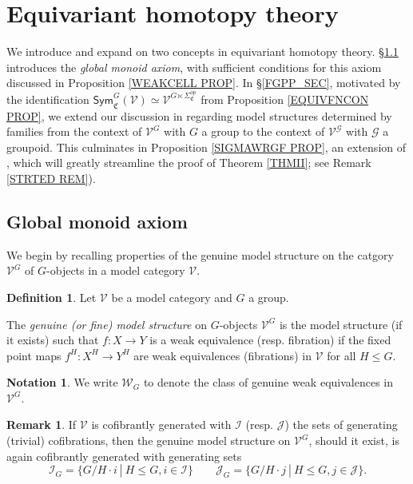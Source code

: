 \documentclass[a4paper,10pt
,draft
]{article}%
\numberwithin{equation}{section}
\numberwithin{figure}{section}
\theoremstyle{definition} %
\newtheorem{definition}[equation]{Definition}%
\newtheorem{remark}[equation]{Remark}%
\newtheorem{notation}[equation]{Notation}%
\newcommand{\V}{\ensuremath{\mathcal V}}
\newcommand{\G}{\ensuremath{\mathcal G}}
\newcommand{\1}{\ensuremath{\mathbbm 1}}%
\begin{document}
\section{Equivariant homotopy theory}
\label{EHT_SEC}


We introduce and expand on two concepts in equivariant homotopy theory.
\S \ref{GMA_SEC} introduces the \emph{global monoid axiom}, 
with sufficient conditions for this axiom discussed in 
Proposition \ref{WEAKCELL PROP}.
In \S \ref{FGPP_SEC},
motivated by the identification
$\mathsf{Sym}^{G}_{\mathfrak{C}}(\V)
\simeq \V^{G \ltimes \Sigma^{op}_{\mathfrak{C}}}$
from Proposition \ref{EQUIVFNCON PROP}, 
we extend our discussion 
in \cite[\S 6]{BP_geo}
regarding model structures determined by families
from the context of $\V^G$ with $G$ a group to the context of
$\V^{\G}$ with $\G$ a groupoid.
This culminates in Proposition \ref{SIGMAWRGF PROP}, an extension of \cite[Prop. 6.25]{BP_geo},
which will greatly streamline the proof of Theorem \ref{THMII}; see Remark \ref{STRTED REM}).


\subsection{Global monoid axiom}
\label{GMA_SEC}

We begin by recalling properties of the genuine model structure on the catgory $\V^G$ of $G$-objects in a model category $\V$.

\begin{definition}\label{GENMOD DEF}
	Let $\V$ be a model category and $G$ a group.
	
	The \emph{genuine (or fine) model structure} on $G$-objects $\V^G$
	is the model structure (if it exists)
	such that
	$f\colon X \to Y$
	is a weak equivalence (resp. fibration)
	if the fixed point maps
	$f^H\colon X^H \to Y^H$
	are weak equivalences (fibrations) in $\V$
	for all $H \leq G$.
\end{definition}


\begin{notation}
	We write $\mathcal{W}_G$
	to denote the class of genuine weak equivalences in $\V^G$.
\end{notation}


\begin{remark}
	If $\V$ is cofibrantly generated with 
	$\mathcal{I}$ (resp. $\mathcal{J}$)
	the sets of generating (trivial) cofibrations,
	then the genuine model structure on $\V^G$,
	should it exist,
	is again cofibrantly generated with generating sets
	\begin{equation}\label{GENGENSETEQ}
	\mathcal{I}_G = \{G/H \cdot i \ | \ H\leq G,i\in \mathcal{I}\}
	\qquad
	\mathcal{J}_G = \{G/H \cdot j \ | \ H\leq G,j\in \mathcal{J}\}.
	\end{equation}
\end{remark}
\end{document}
